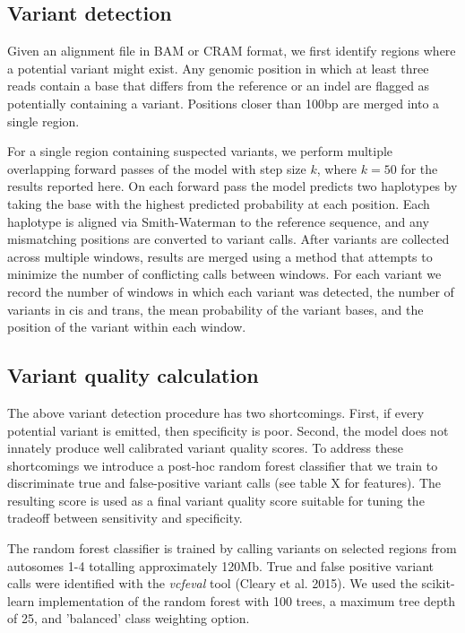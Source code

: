 \documentclass[]{article}
\begin{document}
\subsection{Variant detection}

Given an alignment file in BAM or CRAM format, we first identify regions where a potential variant might exist. Any genomic position in which at least three reads contain a base that differs from the reference or an indel are flagged as potentially containing a variant. Positions closer than 100bp are merged into a single region. 

For a single region containing suspected variants, we perform multiple overlapping forward passes of the model with step size $k$, where $k=50$ for the results reported here. On each forward pass the model predicts two haplotypes by taking the base with the highest predicted probability at each position. Each haplotype is aligned via Smith-Waterman to the reference sequence, and any mismatching positions are converted to variant calls. After variants are collected across multiple windows, results are merged using a method that attempts to minimize the number of conflicting calls between windows. For each variant we record the number of windows in which each variant was detected, the number of variants in cis and trans, the mean probability of the variant bases, and the position of the variant within each window.  


\subsection{Variant quality calculation}

The above variant detection procedure has two shortcomings. First, if every potential variant is emitted, then specificity is poor. Second, the model does not innately produce well calibrated variant quality scores. To address these shortcomings we introduce a post-hoc random forest classifier that we train to discriminate true and false-positive variant calls (see table X for features).  The resulting score is used as a final variant quality score suitable for tuning the tradeoff between sensitivity and specificity. 

The random forest classifier is trained by calling variants on selected regions from autosomes 1-4 totalling approximately 120Mb. True and false positive variant calls were identified with the \textit{vcfeval} tool (Cleary et al. 2015). We used the scikit-learn implementation of the random forest with 100 trees, a maximum tree depth of 25, and 'balanced' class weighting option.  
\end{document}
